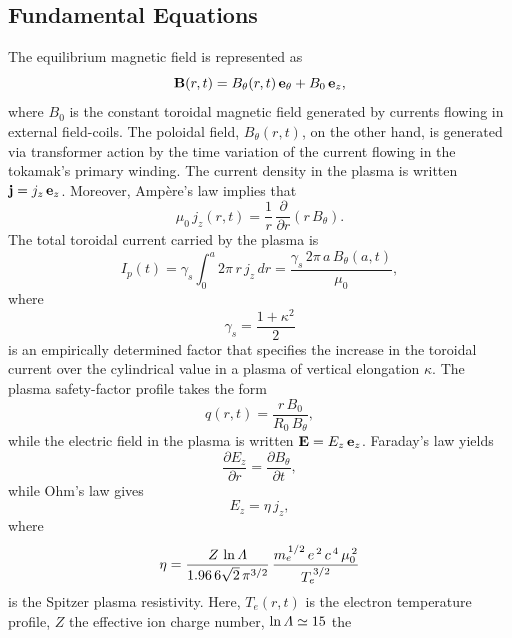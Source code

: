 \documentclass[12pt,prb,aps]{revtex4-1}
\begin{document}
\subsection{Fundamental Equations}
The equilibrium magnetic field is represented as
\begin{equation}
{\bf B}(r,t) = B_\theta(r,t)\,{\bf e}_\theta+ B_0\,{\bf e}_z,
\end{equation}
where $B_0$ is the constant toroidal magnetic field generated by  currents flowing in external  field-coils. The poloidal field, $B_\theta(r,t)$, on the other hand, is generated
via transformer action by the time variation of the current flowing in the tokamak's primary winding. The current density in the plasma is written ${\bf j}= j_z\,{\bf e}_z$. Moreover, Amp\`{e}re's law implies that
\begin{equation}
\mu_0\,j_z(r,t) = \frac{1}{r}\,\frac{\partial}{\partial r}(r\,B_\theta).
\end{equation}
The total toroidal current carried by the plasma is
\begin{equation}
I_p(t)= \gamma_s\int_0^a 2\pi\,r\,j_z\,dr = \frac{\gamma_s\,2\pi\,a\,B_\theta(a,t)}{\mu_0},
\end{equation}
where
\begin{equation}
\gamma_s = \frac{1+\kappa^2}{2}
\end{equation}
is an empirically determined factor that specifies the increase in the toroidal current over the cylindrical value in a plasma of vertical elongation $\kappa$.\cite{creely,uckam}
The plasma safety-factor profile takes the form 
\begin{equation}
q(r,t) = \frac{r\,B_0}{R_0\,B_\theta},
\end{equation}
while the electric field in the plasma is written ${\bf E}= E_z\,{\bf e}_z$. Faraday's law yields
\begin{equation}
\frac{\partial E_z}{\partial r} = \frac{\partial B_\theta}{\partial t},
\end{equation}
while Ohm's law gives
\begin{equation}
E_z = \eta\,j_z,
\end{equation}
where
\begin{equation}
\eta = \frac{Z\,\ln{\mit\Lambda}}{1.96\,6\sqrt{2}\,\pi^{3/2}}\,\frac{m_e^{\,1/2}\,e^{\,2}\,c^{\,4}\,\mu_0^{\,2}}{T_e^{\,3/2}}
\end{equation}
is the Spitzer plasma resistivity.\cite{spitzer,fitz} Here, $T_e(r,t)$ is the electron temperature profile, $Z$ the effective ion charge number, $\ln{\mit\Lambda}\simeq 15$ the
\end{document}
